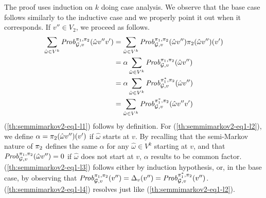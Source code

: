 \begin{myproof}
  The proof uses induction on $k$ doing case analysis. We observe that
  the base case follows similarly to the inductive case and we
  properly point it out when it corresponds.
  If $v'' \in V_2$, we proceed as follows.
  \begin{align}	
    \label{th:semmimarkov2-eq1-l1}
    \sum_{\hat{\omega} \in V^k}\mathit{Prob}^{\pi_{1}, \pi_{2}}_{\mathcal{G},v}(\hat{\omega}v''v')
    & = \sum_{\hat{\omega} \in V^k}\mathit{Prob}^{\pi_{1}, \pi_{2}}_{\mathcal{G},v}(\hat{\omega}v'') \pi_{2}(\hat{\omega}v'')(v')\\
    \label{th:semmimarkov2-eq1-l2}
    & = \alpha \sum_{\hat{\omega} \in V^k}\mathit{Prob}^{\pi_{1}, \pi_{2}}_{\mathcal{G},v}(\hat{\omega}v'') \\
    \label{th:semmimarkov2-eq1-l3}
    & = \alpha \sum_{\hat{\omega} \in V^k}\mathit{Prob}^{\pi^*_{1}, \pi_{2}}_{\mathcal{G},v}(\hat{\omega}v'') \\
    \label{th:semmimarkov2-eq1-l4}
    & = \sum_{\hat{\omega} \in V^k}\mathit{Prob}^{\pi^*_{1}, \pi_{2}}_{\mathcal{G},v}(\hat{\omega}v''v')
  \end{align}
  (\ref{th:semmimarkov2-eq1-l1}) follows by definition.
  For (\ref{th:semmimarkov2-eq1-l2}), we define $\alpha =
  \pi_{2}(\hat{\omega}v'')(v')$ if $\hat{\omega}$ starts at $v$.  By
  recalling that the semi-Markov nature of $\pi_{2}$ defines the
  same $\alpha$ for any $\hat{\omega}\in V^k$ starting at $v$, and that
  $\mathit{Prob}^{\pi_{1}, \pi_{2}}_{\mathcal{G},v}(\hat{\omega}v'') = 0$ if
  $\hat{\omega}$ does not start at $v$, $\alpha$ results to be common
  factor.
  (\ref{th:semmimarkov2-eq1-l3}) follows either by induction
  hypothesis, or, in the base case, by observing that
  $\mathit{Prob}^{\pi_{1}, \pi_{2}}_{\mathcal{G},v}(v'') =
  \Delta_v(v'')=\mathit{Prob}^{\pi^*_{1}, \pi_{2}}_{\mathcal{G},v}(v'')$.
  (\ref{th:semmimarkov2-eq1-l4}) resolves just like
  (\ref{th:semmimarkov2-eq1-l2}).


\end{myproof}
